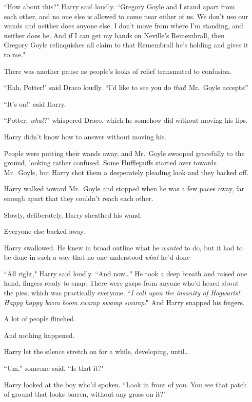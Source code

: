 ``How about this?" Harry said loudly. ``Gregory Goyle and I stand apart from each other, and no one else is allowed to come near either of us. We don't use our wands and neither does anyone else. I don't move from where I'm standing, and neither does he. And if I can get my hands on Neville's Remembrall, then Gregory Goyle relinquishes all claim to that Remembrall he's holding and gives it to me."

There was another pause as people's looks of relief transmuted to confusion.

``Hah, Potter!" said Draco loudly. ``I'd like to see you do \emph{that}! Mr.~Goyle accepts!"

``It's on!" said Harry.

``Potter, \emph{what}?" whispered Draco, which he somehow did without moving his lips.

Harry didn't know how to answer without moving his.

People were putting their wands away, and Mr.~Goyle swooped gracefully to the ground, looking rather confused. Some Hufflepuffs started over towards Mr.~Goyle, but Harry shot them a desperately pleading look and they backed off.

Harry walked toward Mr.~Goyle and stopped when he was a few paces away, far enough apart that they couldn't reach each other.

Slowly, deliberately, Harry sheathed his wand.

Everyone else backed away.

Harry swallowed. He knew in broad outline what he \emph{wanted} to do, but it had to be done in such a way that no one understood \emph{what} he'd done—

``All right," Harry said loudly. ``And now{\ldots}" He took a deep breath and raised one hand, fingers ready to snap. There were gasps from anyone who'd heard about the pies, which was practically everyone. ``\emph{I call upon the insanity of Hogwarts! Happy happy boom boom swamp swamp swamp!}" And Harry snapped his fingers.

A lot of people flinched.

And nothing happened.

Harry let the silence stretch on for a while, developing, until{\ldots}

``Um," someone said. ``Is that it?"

Harry looked at the boy who'd spoken. ``Look in front of you. You see that patch of ground that looks barren, without any grass on it?"

